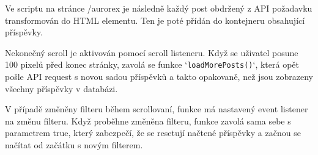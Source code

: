 \par Ve scriptu na stránce /aurorex je následně každý post obdržený z API požadavku transformován do HTML elementu. Ten je poté přídán do kontejneru  obsahující příspěvky. 
\par Nekonečný scroll je aktivován pomocí scroll listeneru. Když se uživatel posune 100 pixelů před konec stránky, zavolá se funkce `\texttt{loadMorePosts()}`, která opět pošle API request s novou sadou příspěvků a takto opakovaně, než jsou zobrazeny všechny příspěvky v databázi.
\par V případě změněny filteru během scrollovaní, funkce má nastavený event listener na změnu filteru. Když proběhne změněna filteru, funkce zavolá sama sebe s parametrem true, který zabezpečí, že se resetují načtené příspěvky a začnou se načítat od začátku s novým filterem.